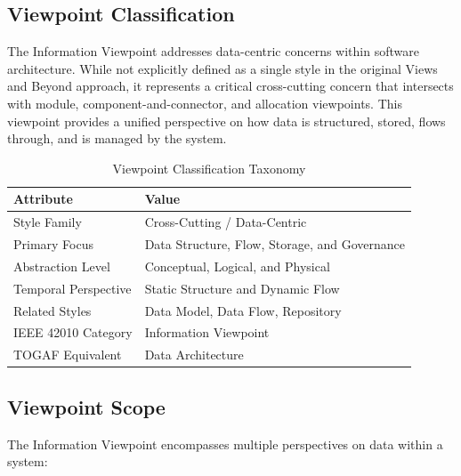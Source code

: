 \documentclass[11pt,letterpaper]{article}
\begin{document}
\subsection{Viewpoint Classification}

The Information Viewpoint addresses data-centric concerns within software architecture. While not explicitly defined as a single style in the original Views and Beyond approach, it represents a critical cross-cutting concern that intersects with module, component-and-connector, and allocation viewpoints. This viewpoint provides a unified perspective on how data is structured, stored, flows through, and is managed by the system.

\begin{table}[H]
\centering
\caption{Viewpoint Classification Taxonomy}
\begin{tabular}{@{}L{4cm}L{10cm}@{}}
\toprule
\textbf{Attribute} & \textbf{Value} \\
\midrule
Style Family & Cross-Cutting / Data-Centric \\
Primary Focus & Data Structure, Flow, Storage, and Governance \\
Abstraction Level & Conceptual, Logical, and Physical \\
Temporal Perspective & Static Structure and Dynamic Flow \\
Related Styles & Data Model, Data Flow, Repository \\
IEEE 42010 Category & Information Viewpoint \\
TOGAF Equivalent & Data Architecture \\
\bottomrule
\end{tabular}
\end{table}

\subsection{Viewpoint Scope}

The Information Viewpoint encompasses multiple perspectives on data within a system:
\end{document}
